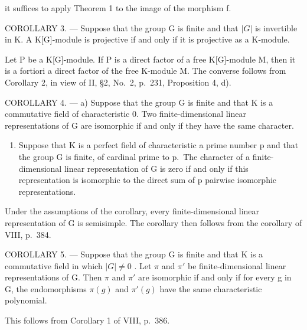 it suffices to apply Theorem 1 to the image of the morphism f.

COROLLARY 3. --- Suppose that the group G is finite and that \(|G|\) is invertible in K. A K{[}G{]}-module is projective if and only if it is projective as a K-module.

Let P be a K{[}G{]}-module. If P is a direct factor of a free K{[}G{]}-module M, then it is a fortiori a direct factor of the free K-module M. The converse follows from Corollary 2, in view of II, §2, No.~2, p.~231, Proposition 4, d).

COROLLARY 4. --- a) Suppose that the group G is finite and that K is a commutative field of characteristic 0. Two finite-dimensional linear representations of G are isomorphic if and only if they have the same character.

\begin{enumerate}
\def\labelenumi{\alph{enumi})}
\setcounter{enumi}{1}
\tightlist
\item
  Suppose that K is a perfect field of characteristic a prime number p and that the group G is finite, of cardinal prime to p.~The character of a finite-dimensional linear representation of G is zero if and only if this representation is isomorphic to the direct sum of p pairwise isomorphic representations.
\end{enumerate}

Under the assumptions of the corollary, every finite-dimensional linear representation of G is semisimple. The corollary then follows from the corollary of VIII, p.~384.

COROLLARY 5. --- Suppose that the group G is finite and that K is a commutative field in which \(|G| \neq 0\) . Let \(\pi\) and \(\pi'\) be finite-dimensional linear representations of G. Then \(\pi\) and \(\pi'\) are isomorphic if and only if for every g in G, the endomorphisms \(\pi(g)\) and \(\pi'(g)\) have the same characteristic polynomial.

This follows from Corollary 1 of VIII, p.~386.

